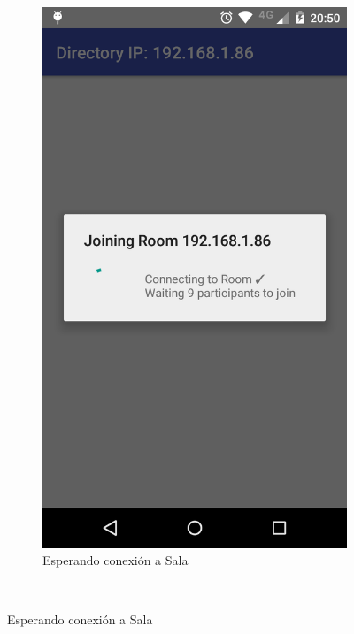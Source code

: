 \begin{figure}[H]
    \centering
    \begin{subfigure}[b]{0.4\textwidth}
        \includegraphics[width=\textwidth]{imagenes/mobile_connecting.png}
        \caption{Esperando conexión a Sala}
        \label{fig:mobile_waiting}
    \end{subfigure}
    ~ %

\end{figure}
